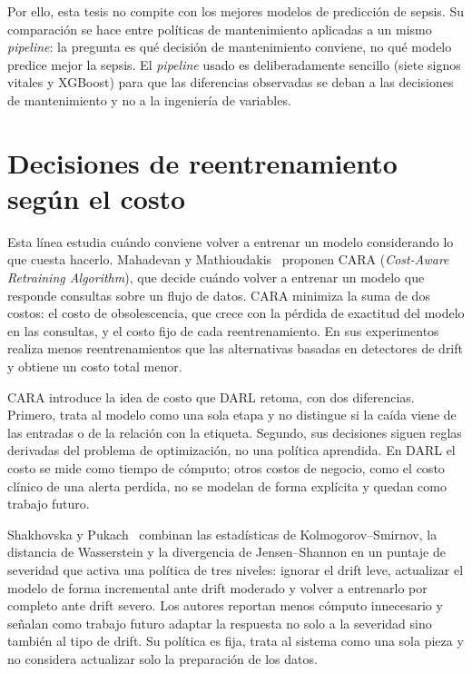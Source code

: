 Por ello, esta tesis no compite con los mejores modelos de predicción de sepsis. Su
comparación se hace entre políticas de mantenimiento aplicadas a un mismo
\textit{pipeline}: la pregunta es qué decisión de mantenimiento conviene, no qué modelo
predice mejor la sepsis. El \textit{pipeline} usado es deliberadamente sencillo (siete
signos vitales y XGBoost) para que las diferencias observadas se deban a las decisiones de
mantenimiento y no a la ingeniería de variables.

\section{Decisiones de reentrenamiento según el costo}
\label{sec:lit_costo}

Esta línea estudia cuándo conviene volver a entrenar un modelo considerando lo que cuesta
hacerlo. Mahadevan y Mathioudakis~\cite{mahadevan2024cost} proponen CARA (\textit{Cost-Aware
Retraining Algorithm}), que decide cuándo volver a entrenar un modelo que responde
consultas sobre un flujo de datos. CARA minimiza la suma de dos costos: el costo de
obsolescencia, que crece con la pérdida de exactitud del modelo en las consultas, y el
costo fijo de cada reentrenamiento. En sus experimentos realiza menos reentrenamientos que
las alternativas basadas en detectores de drift y obtiene un costo total menor.

CARA introduce la idea de costo que DARL retoma, con dos diferencias. Primero, trata al
modelo como una sola etapa y no distingue si la caída viene de las entradas o de la relación
con la etiqueta. Segundo, sus decisiones siguen reglas derivadas del problema de
optimización, no una política aprendida. En DARL el costo se mide como tiempo de cómputo;
otros costos de negocio, como el costo clínico de una alerta perdida, no se modelan de
forma explícita y quedan como trabajo futuro.

Shakhovska y Pukach~\cite{shakhovska2025severity} combinan las estadísticas de
Kolmogorov--Smirnov, la distancia de Wasserstein y la divergencia de Jensen--Shannon en un
puntaje de severidad que activa una política de tres niveles: ignorar el drift leve,
actualizar el modelo de forma incremental ante drift moderado y volver a entrenarlo por
completo ante drift severo. Los autores reportan menos cómputo innecesario y señalan como
trabajo futuro adaptar la respuesta no solo a la severidad sino también al tipo de drift.
Su política es fija, trata al sistema como una sola pieza y no considera actualizar solo la
preparación de los datos.

